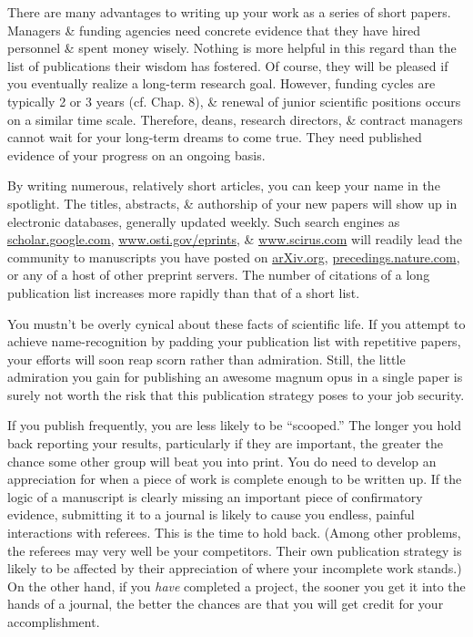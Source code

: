 \documentclass{article}
\begin{document}
\begin{enumerate}
\begin{itemize}
\begin{itemize}
			There are many advantages to writing up your work as a series of short papers. Managers \& funding agencies need concrete evidence that they have hired personnel \& spent money wisely. Nothing is more helpful in this regard than the list of publications their wisdom has fostered. Of course, they will be pleased if you eventually realize a long-term research goal. However, funding cycles are typically 2 or 3 years (cf. Chap. 8), \& renewal of junior scientific positions occurs on a similar time scale. Therefore, deans, research directors, \& contract managers cannot wait for your long-term dreams to come true. They need published evidence of your progress on an ongoing basis.

			By writing numerous, relatively short articles, you can keep your name in the spotlight. The titles, abstracts, \& authorship of your new papers will show up in electronic databases, generally updated weekly. Such search engines as \url{scholar.google.com}, \url{www.osti.gov/eprints},
			\& \url{www.scirus.com} will readily lead the community to manuscripts you have posted on \url{arXiv.org}, \url{precedings.nature.com}, or any of a host of other preprint servers. The number of citations of a long publication list increases more rapidly than that of a short list.

			You mustn't be overly cynical about these facts of scientific life. If you attempt to achieve name-recognition by padding your publication list with repetitive papers, your efforts will soon reap scorn rather than admiration. Still, the little admiration you gain for publishing an awesome magnum opus in a single paper is surely not worth the risk that this publication strategy poses to your job security.

			If you publish frequently, you are less likely to be ``scooped.'' The longer you hold back reporting your results, particularly if they are important, the greater the chance some other group will beat you into print. You do need to develop an appreciation for when a piece of work is complete enough to be written up. If the logic of a manuscript is clearly missing an important piece of confirmatory evidence, submitting it to a journal is likely to cause you endless, painful interactions with referees. This is the time to hold back. (Among other problems, the referees may very well be your competitors. Their own publication strategy is likely to be affected by their appreciation of where your incomplete work stands.) On the other hand, if you \textit{have} completed a project, the sooner you get it into the hands of a journal, the better the chances are that you will get credit for your accomplishment.


\end{itemize}
\end{itemize}
\end{enumerate}
\end{document}
